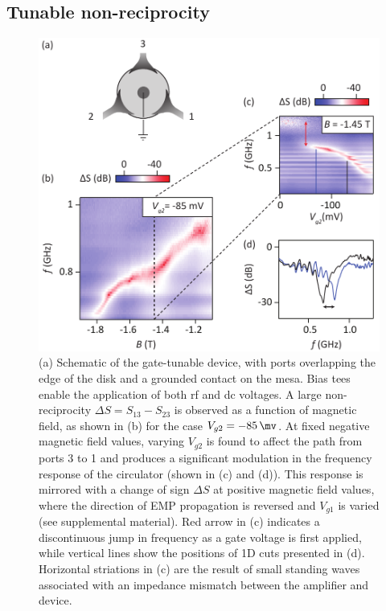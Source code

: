 \subsection{Tunable non-reciprocity}
\begin{figure}
\includegraphics[width=0.75\columnwidth]{fig5_QH}
\caption[Tunable non-reciprocity of the quantum Hall circulator]{\label{FIG. 5.}
(a) Schematic of the gate-tunable device, with ports overlapping the edge of the disk and a grounded contact on the mesa. Bias tees enable the application of both rf and dc voltages. 
A large non-reciprocity $\Delta S = S_{13}-S_{23}$ is observed as a function of magnetic field, as shown in (b) for the case $V_{g2} = \SI{-85}{\mv}$. 
At fixed negative magnetic field values, varying $V_{g2}$ is found to affect the path from ports 3 to 1 and produces a significant modulation in the frequency response of the circulator (shown in (c) and (d)). This response is mirrored with a change of sign $\Delta S$ at positive magnetic field values, where the direction of EMP propagation is reversed and $V_{g1}$ is varied (see supplemental material).  Red arrow in (c)  indicates a discontinuous jump in frequency as a gate voltage is first applied, while vertical lines show the positions of 1D cuts presented in (d). Horizontal striations in (c) are the result of small standing waves associated with an impedance mismatch between the amplifier and device.}
\end{figure}

